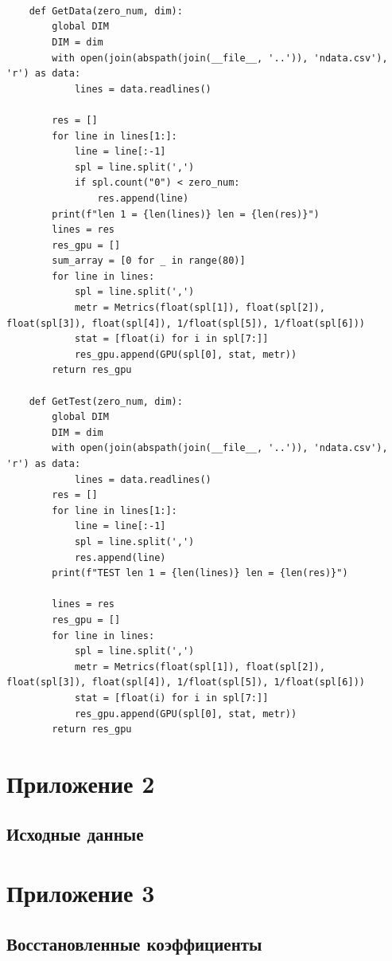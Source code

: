 \documentclass[14pt, a4paper]{extarticle}
\begin{document}
\begin{lstlisting}
    
    
    
    def GetData(zero_num, dim):
        global DIM
        DIM = dim
        with open(join(abspath(join(__file__, '..')), 'ndata.csv'), 'r') as data:
            lines = data.readlines()
        
        res = []
        for line in lines[1:]:
            line = line[:-1]
            spl = line.split(',')
            if spl.count("0") < zero_num:
                res.append(line)
        print(f"len 1 = {len(lines)} len = {len(res)}")
        lines = res
        res_gpu = []
        sum_array = [0 for _ in range(80)]
        for line in lines:
            spl = line.split(',')
            metr = Metrics(float(spl[1]), float(spl[2]), float(spl[3]), float(spl[4]), 1/float(spl[5]), 1/float(spl[6]))
            stat = [float(i) for i in spl[7:]]
            res_gpu.append(GPU(spl[0], stat, metr))
        return res_gpu
    
    def GetTest(zero_num, dim):
        global DIM
        DIM = dim
        with open(join(abspath(join(__file__, '..')), 'ndata.csv'), 'r') as data:
            lines = data.readlines()
        res = []
        for line in lines[1:]:
            line = line[:-1]
            spl = line.split(',')
            res.append(line)
        print(f"TEST len 1 = {len(lines)} len = {len(res)}")
        
        lines = res
        res_gpu = []
        for line in lines:
            spl = line.split(',')
            metr = Metrics(float(spl[1]), float(spl[2]), float(spl[3]), float(spl[4]), 1/float(spl[5]), 1/float(spl[6]))
            stat = [float(i) for i in spl[7:]]
            res_gpu.append(GPU(spl[0], stat, metr))
        return res_gpu
  \end{lstlisting}
  \section{Приложение 2}
\subsection{Исходные данные}
\begin{table}
    \centering
    \scriptsize
    
\end{table}
\newpage
\section{Приложение 3}
\subsection{Восстановленные коэффициенты}
\begin{table}
    \centering
    \scriptsize
    
\end{table}
\end{document}

